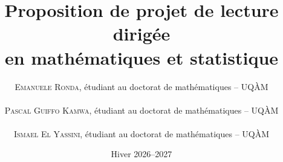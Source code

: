 

\title{\textbf{Proposition de projet de lecture dirigée\\ en mathématiques et statistique}}
\author{%
\begin{minipage}{0.9\textwidth}
\centering
\textsc{Emanuele Ronda}, étudiant au doctorat de mathématiques -- UQ\`AM \\ \\[0.5em]
\textsc{Pascal Guiffo Kamwa}, étudiant au doctorat de mathématiques -- UQ\`AM \\ \\[0.5em]
\textsc{Ismael El Yassini}, étudiant au doctorat de mathématiques -- UQ\`AM \\ 
\end{minipage}
}
\date{Hiver 2026--2027}


\maketitle
\thispagestyle{fancy}










